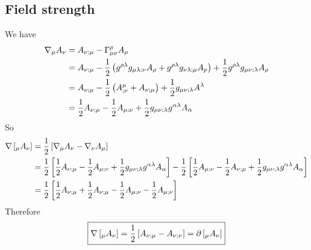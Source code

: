 \documentclass{article}
\begin{document}
 	\pagebreak
 	\subsection{Field strength}
 	We have 
 	\begin{align*}
 		\nabla_\mu A_\nu &= A_{\nu;\mu} - \Gamma_{\mu\nu}^\rho A_\rho \\
 		&= A_{\nu;\mu} -  \frac12 \left( g^{\rho\lambda} g_{\mu\lambda;\nu} A_\rho + g^{\rho\lambda}g_{\nu\lambda;\mu} A_p \right) + \frac12 g^{\rho\lambda} g_{\mu\nu;\lambda} A_\rho\\
 		&= A_{\nu;\mu} - \frac12 \left( A^\mu_{;\nu} + A_{\nu;\mu} \right) + \frac12 g_{\mu\nu;\lambda} A^\lambda\\
 		&= \frac12 A_{\nu;\mu} -\frac12 A_{\mu;\nu} + \frac12 g_{\mu\nu;\lambda}g^{\alpha\lambda} A_\alpha
 	\end{align*}
 	So
 	\begin{align*}
 		\nabla \left[_\mu A_\nu\right] &= \frac12 \left[ \nabla_\mu A_\nu - \nabla_\nu A_\mu \right] \\
 		&= \frac12 \left[ \frac12 A_{\nu;\mu} - \frac12 A_{\mu;\nu} + \frac12 g_{\mu\nu;\lambda} g^{\alpha\lambda} A_\alpha\right] - \frac12 \left[ \frac12 A_{\mu;\nu} - \frac12 A_{\nu;\mu} + \frac12 g_{\mu\nu;\lambda} g^{\alpha\lambda} A_\alpha\right] \\
 		&= \frac12 \left[ \frac12 A_{\nu;\mu} + \frac12 A_{\nu;\mu} - \frac12 A_{\mu;\nu} - \frac12 A_{\mu;\nu} \right]
 	\end{align*}
 	Therefore
 	\begin{equation}
 		\label{ans:1c}
 		\boxed{\nabla \left[_\mu A_\nu \right] = \frac12 \left[ A_{\nu;\mu} - A_{\nu;\nu} \right] = \partial \left[_\mu A_\nu\right]}
 	\end{equation}
 
 	\pagebreak
\end{document}
